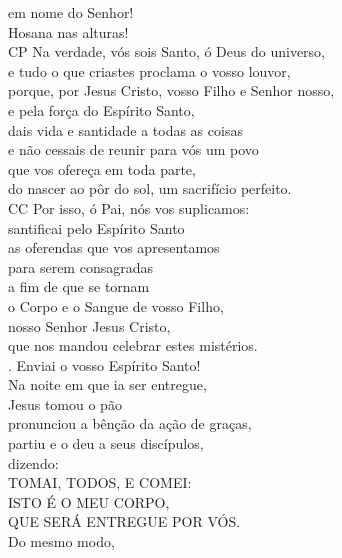 \documentclass{book}
\begin{document}
\begin{flushleft}
    em nome do Senhor! \\
    Hosana nas alturas!
    \vspace{.2cm} \\
    {\color{VioletRed2}CP} Na verdade, vós sois Santo, ó Deus do universo, \\
    e tudo o que criastes proclama o vosso louvor, \\
    porque, por Jesus Cristo, vosso Filho e Senhor nosso, \\
    e pela força do Espírito Santo, \\
    dais vida e santidade a todas as coisas \\
    e não cessais de reunir para vós um povo \\
    que vos ofereça em toda parte, \\
    do nascer ao pôr do sol, um sacrifício perfeito.
    \vspace{.2cm} \\
    {\color{VioletRed2}CC} Por isso, ó Pai, nós vos suplicamos: \\
    santificai pelo Espírito Santo \\
    as oferendas que vos apresentamos \\
    para serem consagradas \\
    a fim de que se tornam \\
    o Corpo e \grecrossRed{} o Sangue de vosso Filho, \\
    nosso Senhor Jesus Cristo, \\
    que nos mandou celebrar estes mistérios.
    \vspace{.2cm} \\
    {\color{VioletRed2} \Rbar.} Enviai o vosso Espírito Santo!
    \vspace{.2cm} \\
    Na noite em que ia ser entregue, \\
    Jesus tomou o pão \\
    pronunciou a bênção da ação de graças, \\
    partiu e o deu a seus discípulos, \\
    dizendo:
    \vspace{.2cm} \\
    TOMAI, TODOS, E COMEI: \\
    ISTO É O MEU CORPO, \\
    QUE SERÁ ENTREGUE POR VÓS.
    \vspace{.2cm} \\
    Do mesmo modo, \\

\end{flushleft}
\end{document}
